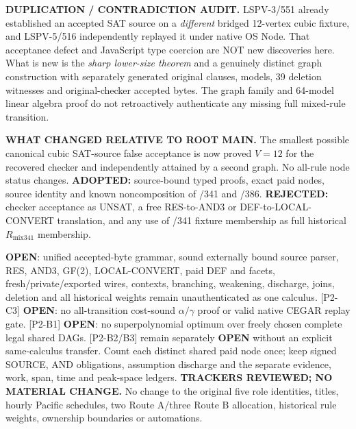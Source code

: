 \documentclass[11pt]{article}
\begin{document}
\textbf{DUPLICATION / CONTRADICTION AUDIT.} LSPV-3/551 already
established an accepted SAT source on a \emph{different} bridged
12-vertex cubic fixture, and LSPV-5/516 independently replayed it
under native OS Node. That acceptance defect and JavaScript type
coercion are NOT new discoveries here. What is new is the
\emph{sharp lower-size theorem} and a genuinely distinct graph
construction with separately generated original clauses, models,
39 deletion witnesses and original-checker accepted bytes.
The graph family and 64-model linear algebra proof do not
retroactively authenticate any missing full mixed-rule transition.

\textbf{WHAT CHANGED RELATIVE TO ROOT MAIN.}
The smallest possible canonical cubic SAT-source false acceptance
is now proved $V=12$ for the recovered checker and independently
attained by a second graph. No all-rule node status changes.
\textbf{ADOPTED:} source-bound typed proofs, exact paid nodes,
source identity and known noncomposition of /341 and /386.
\textbf{REJECTED:} checker acceptance as UNSAT, a free RES-to-AND3
or DEF-to-LOCAL-CONVERT translation, and any use of /341 fixture
membership as full historical $R_{\mathrm{mix341}}$ membership.

\noindent [P2-D1] \textbf{OPEN}: unified accepted-byte grammar,
sound externally bound source parser, RES, AND3, GF(2),
LOCAL-CONVERT, paid DEF and facets, fresh/private/exported
wires, contexts, branching, weakening, discharge, joins, deletion
and all historical weights remain unauthenticated as one calculus.
[P2-C3] \textbf{OPEN}: no all-transition
cost-sound $\alpha/\gamma$ proof or valid native CEGAR replay gate.
[P2-B1] \textbf{OPEN}: no superpolynomial optimum over freely
chosen complete legal shared DAGs. [P2-B2/B3] remain
separately \textbf{OPEN} without an explicit same-calculus transfer.
Count each distinct shared paid node once; keep signed SOURCE,
AND obligations, assumption discharge and the separate evidence,
work, span, time and peak-space ledgers.
\textbf{TRACKERS REVIEWED; NO MATERIAL CHANGE.}
No change to the original five role identities, titles,
hourly Pacific schedules, two Route A/three Route B allocation,
historical rule weights, ownership boundaries or automations.
\end{document}
